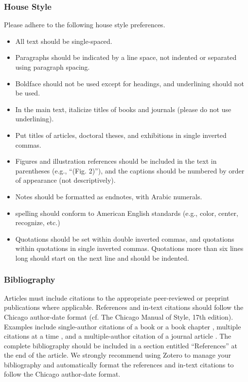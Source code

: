 \documentclass[12pt]{article}
\begin{document}
\subsubsection{House Style}
Please adhere to the following house style preferences.
\begin{itemize}[noitemsep]
    \item All text should be single-spaced.
    \item Paragraphs should be indicated by a line space, not indented or separated using paragraph spacing.
    \item Boldface should not be used except for headings, and underlining should not be used.
    \item In the main text, italicize titles of books and journals (please do not use underlining).
    \item Put titles of articles, doctoral theses, and exhibitions in single inverted commas.
    \item Figures and illustration references should be included in the text in parentheses (e.g., “(Fig. 2)”), and the captions should be numbered by order of appearance (not descriptively).
	\item Notes should be formatted as endnotes, with Arabic numerals.
    \item spelling should conform to American English standards (e.g., color, center, recognize, etc.)
    \item Quotations should be set within double inverted commas, and quotations within quotations in single inverted commas. Quotations more than six lines long should start on the next line and should be indented.
\end{itemize}

\subsubsection{Bibliography}
Articles must include citations to the appropriate peer-reviewed or preprint publications where applicable. References and in-text citations should follow the Chicago author-date format (cf. The Chicago Manual of Style, 17th edition). Examples include single-author citations of a book \parencite{tymoczko_geometry_2011} or a book chapter \parencite{spiegel_thoughts_2018}, multiple citations at a time \parencite{schoenberg_theory_2010, wyschnegradsky_manual_2017}, and a multiple-author citation of a journal article \parencite{michon_mobile_2017}. The complete bibliography should be included in a section entitled “References” at the end of the article. We strongly recommend using Zotero to manage your bibliography and automatically format the references and in-text citations to follow the Chicago author-date format.
\end{document}
